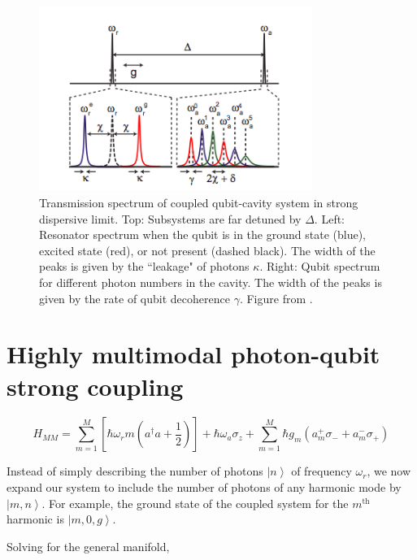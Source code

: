 \documentclass[11 pt, oneside]{book} %
\newcommand{\ket}[1]{\left| #1 \right>} %
\begin{document}
\begin{figure}[h] 
   \centering
   \includegraphics[width=3.5in]{SchusterDispersiveFrequencyShifts.png} 
   \caption[Transmission spectrum of coupled system in strong dispersive limit]{Transmission spectrum of coupled qubit-cavity system in strong dispersive limit. Top: Subsystems are far detuned by $\Delta$. Left: Resonator spectrum when the qubit is in the ground state (blue), excited state (red), or not present (dashed black). The width of the peaks is given by the ``leakage" of photons $\kappa$. Right: Qubit spectrum for different photon numbers in the cavity. The width of the peaks is given by the rate of qubit decoherence $\gamma$. Figure from \cite{Schuster}.}
   \label{fig:DispersiveFrequencyShifts}
\end{figure}

\chapter{Highly multimodal photon-qubit strong coupling}\label{chap:Multimodal}

\begin{equation}
H_{MM}=\sum_{m=1}^M\left[\hbar\omega_r m (a^{\dag}a+\frac{1}{2})\right]+\hbar\omega_a\sigma_z+\sum^M_{m=1}\hbar g_m(a_m^+\sigma_-+a_m^-\sigma_+)
\end{equation}

Instead of simply describing the number of photons $\ket{n}$ of frequency $\omega_r$, we now expand our system to include the number of photons of any harmonic mode by $\ket{m,n}$. For example, the ground state of the coupled system for the $m^{\mathrm{th}}$ harmonic is $\ket{m,0,g}$. 

Solving for the general manifold,
\end{document}
